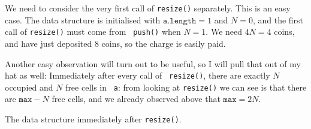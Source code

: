 \documentclass{tufte-handout}
\begin{document}
We need to consider the very first call of {\tt resize()} separately.
This is an easy case.  
The data structure is initialised with $\mathtt{a.length}=1$ and
$N=0$, and the first call of {\tt resize()} must come from {\tt
  push()} when $N=1$.  
We need $4N=4$ coins, and have just deposited $8$ coins, so the charge
is easily paid.

Another easy observation will turn out to be useful, so I will pull
that out of my hat as well:
 Immediately after every call of {\tt
  resize()}, there are exactly $N$ occupied and $N$ free cells in {\tt
  a}: from looking at {\tt resize()} we can see is that there are
$\mathtt{max}-N$ free cells, and we already observed above that
$\mathtt{max}=2N$.
\begin{marginfigure}
  \caption{The data structure immediately after {\tt resize()}.}
\end{marginfigure}
\end{document}
